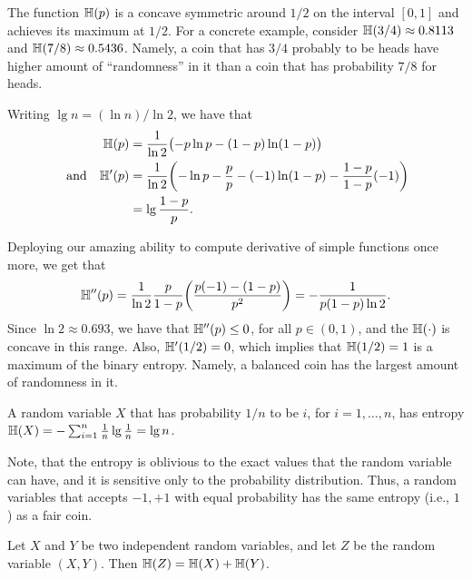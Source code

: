 The function $\Entropy{p}$ is a concave symmetric around $1/2$ on the
interval $[0,1]$ and achieves its maximum at $1/2$. For a concrete
example, consider $\Entropy{3/4} \approx 0.8113$ and $\Entropy{7/8}
\approx 0.5436$. Namely, a coin that has $3/4$ probably to be heads
have higher amount of ``randomness'' in it than a coin that has
probability $7/8$ for heads.

Writing $\lg n = (\ln n)/\ln 2$, we have that
\begin{align*}
  \Entropy{p} &=  \frac{1}{\ln
                2}\pth{\bigl.
                - p \ln p - (1-p)\ln (1-p) }\\
%
  \text{ and ~ }\EntropyChar'\pth{p} &=%
                                       \frac{1}{\ln 2}\pth{\MakeSBig - \ln p -\frac{p}{p} - (-1) \ln(1-p)
                                       - \frac{1-p}{1-p}(-1) }\\
                                       &= \lg \frac{1-p}{p}.
\end{align*}

Deploying our amazing ability to compute derivative of simple
functions once more, we get that
\begin{equation*}
    \EntropyChar''\pth{p}%
    = %
    \frac{1}{\ln 2} \frac{p}{1-p} \pth{ \frac{p(-1) -(1-p)}{p^2}}
    = - \frac{1}{p (1-p) \ln 2}.
\end{equation*}
Since $\ln 2 \approx 0.693$, we have that $\mathbb{H}''(p) \leq 0$,
for all $p \in (0,1)$, and the $\Entropy{\cdot}$ is concave in this
range. Also, $\mathbb{H}'(1/2) =0$, which implies that $\Entropy{1/2} =
1$ is a maximum of the binary entropy. Namely, a balanced coin has the
largest amount of randomness in it.

\begin{example}
    A random variable $X$ that has probability $1/n$ to be $i$, for
    $i=1,\ldots, n$, has entropy $\Entropy{X} = -\sum_{i=1}^n
    \frac{1}{n} \lg \frac{1}{n} = \lg n$.
\end{example}

Note, that the entropy is oblivious to the exact values that the
random variable can have, and it is sensitive only to the probability
distribution. Thus, a random variables that accepts $-1,+1$ with equal
probability has the same entropy (i.e., $1$) as a fair coin.

\begin{lemma}
    Let $X$ and $Y$ be two independent random variables, and let $Z$
    be the random variable $(X,Y)$. Then
    $\Entropy{Z} = \Entropy{X} + \Entropy{Y}$.
\end{lemma}

